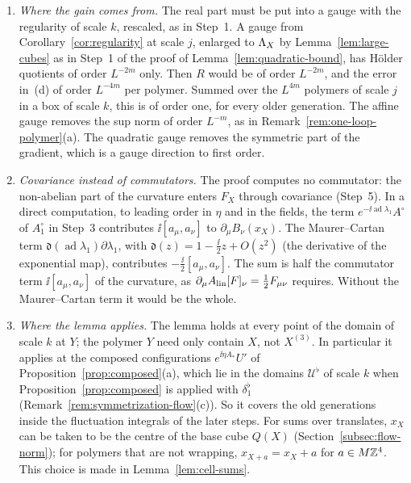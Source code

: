 \begin{remark}\label{rem:later-normal-form}
\begin{enumerate}[label=(\alph*)]
\item \emph{Where the gain comes from.} The real part must be put into a gauge with the regularity of scale $k$, rescaled, as in Step~1. A gauge from Corollary~\ref{cor:regularity} at scale $j$, enlarged to $\Lambda_X$ by Lemma~\ref{lem:large-cubes} as in Step~1 of the proof of Lemma~\ref{lem:quadratic-bound}, has H\"older quotients of order $L^{-2m}$ only. Then $R$ would be of order $L^{-2m}$, and the error in~(d) of order $L^{-4m}$ per polymer. Summed over the $L^{4m}$ polymers of scale $j$ in a box of scale $k$, this is of order one, for every older generation. The affine gauge removes the sup norm of order $L^{-m}$, as in Remark~\ref{rem:one-loop-polymer}(a). The quadratic gauge removes the symmetric part of the gradient, which is a gauge direction to first order.
\item \emph{Covariance instead of commutators.} The proof computes no commutator: the non-abelian part of the curvature enters $F_X$ through covariance (Step~5). In a direct computation, to leading order in $\eta$ and in the fields, the term $e^{-\ii\operatorname{ad}\lambda_1}A^\circ$ of $A^\circ_1$ in Step~3 contributes $\ii[a_\mu,a_\nu]$ to $\partial_\mu B_\nu(x_X)$. The Maurer--Cartan term $\mathfrak d(\operatorname{ad}\lambda_1)\partial\lambda_1$, with $\mathfrak d(z)=1-\frac\ii2z+O(z^2)$ (the derivative of the exponential map), contributes $-\frac\ii2[a_\mu,a_\nu]$. The sum is half the commutator term $\ii[a_\mu,a_\nu]$ of the curvature, as $\partial_\mu A_{\rm lin}[F]_\nu=\frac12F_{\mu\nu}$ requires. Without the Maurer--Cartan term it would be the whole.
\item \emph{Where the lemma applies.} The lemma holds at every point of the domain of scale $k$ at $Y$; the polymer $Y$ need only contain $X$, not $X^{(3)}$. In particular it applies at the composed configurations $e^{\ii\eta A_*}U'$ of Proposition~\ref{prop:composed}(a), which lie in the domains $\mathcal U^\flat$ of scale $k$ when Proposition~\ref{prop:composed} is applied with $\delta_1^\flat$ (Remark~\ref{rem:symmetrization-flow}(c)). So it covers the old generations inside the fluctuation integrals of the later steps. For sums over translates, $x_X$ can be taken to be the centre of the base cube $Q(X)$ (Section~\ref{subsec:flow-norm}); for polymers that are not wrapping, $x_{X+a}=x_X+a$ for $a\in M\mathbb Z^4$. This choice is made in Lemma~\ref{lem:cell-sums}.

\end{enumerate}
\end{remark}
